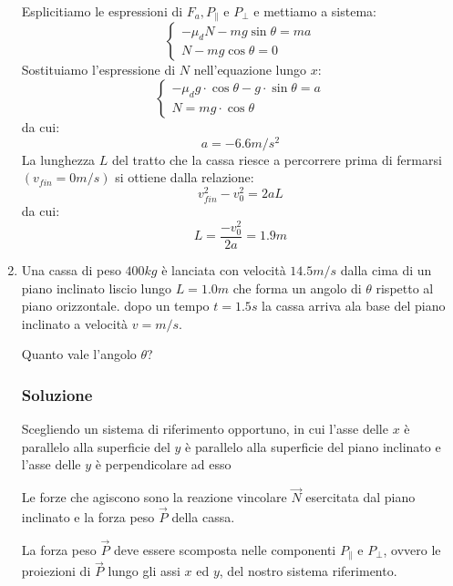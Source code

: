 \documentclass{report}
\begin{document}
\begin{enumerate}
Esplicitiamo le espressioni di $F_a,P_\parallel$ e $P_\bot$ e mettiamo a sistema:
\begin{equation*}
  \begin{cases}
    -\mu_dN-mg\sin\theta=ma\\
    N-mg\cos\theta=0
  \end{cases}
\end{equation*}
Sostituiamo l’espressione di $N$ nell’equazione lungo $x$:
\begin{equation*}
  \begin{cases}
    -\mu_dg\cdot\cos\theta-g\cdot\sin\theta=a\\
    N=mg\cdot \cos\theta
  \end{cases}
\end{equation*}
da cui:
\begin{equation*}
  a=-6.6m/s^2
\end{equation*}
La lunghezza $L$ del tratto che la cassa riesce a percorrere prima di fermarsi $(v_{fin}=0m/s)$ si
ottiene dalla relazione:
\begin{equation*}
  v_{fin}^2-v_0^2=2aL
\end{equation*}
da cui:
\begin{equation*}
  L=\frac{-v_0^2}{2a}=1.9m
\end{equation*}
\item Una cassa di peso $400kg$ è lanciata con velocità $14.5m/s$ dalla cima di un piano inclinato
  liscio lungo $L=1.0m$ che forma un angolo di $\theta$ rispetto al piano orizzontale. dopo un
  tempo $t=1.5s$ la cassa arriva ala base del piano inclinato a velocità $v=m/s$.
  \begin{tasks}
    \task Quanto vale l'angolo $\theta$?
  \end{tasks}
  
\subsubsection{Soluzione}
\label{sec:sol17}

Scegliendo un sistema di riferimento opportuno, in cui l'asse delle $x$ è parallelo alla superficie del
$y$ è parallelo alla superficie del piano inclinato e l'asse delle $y$ è perpendicolare ad esso

Le forze che agiscono sono la reazione vincolare $\vec{N}$ esercitata dal piano inclinato e la forza
peso $\vec{P}$ della cassa.

La forza peso $\vec{P}$ deve essere scomposta nelle componenti $P_\parallel$ e $P_\bot$, ovvero le
proiezioni di $\vec{P}$ lungo gli assi $x$ ed $y$, del nostro sistema riferimento.


\end{enumerate}
\end{document}
